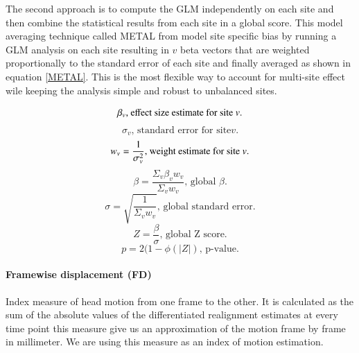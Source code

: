 \documentclass[authoryear]{elsarticle}
\begin{document}
The second approach is to compute the GLM independently on each site and then combine the statistical results from each site in a global score. This model averaging technique called METAL from \cite{Willer2010} model site specific bias by running a GLM analysis on each site resulting in $v$ beta vectors that are weighted proportionally to the standard error of each site and finally averaged as shown in equation \ref{METAL}. This is the most flexible way to account for multi-site effect wile keeping the analysis simple and robust to unbalanced sites.

\begin{equation}
	\beta_{v} \text{, effect size estimate for site \textit{v}.}
\end{equation}
\begin{equation}
	\sigma_{v} \text{, standard error for site} \textit{v}.
\end{equation}
\begin{equation}
 	w_{v}=\frac{1}{\sigma_{v}^{2}} \text{, weight estimate for site \textit{v}.}
 \end{equation}
 \begin{equation}
 	\beta=\frac{\Sigma_{v}\beta_{v}w_{v}}{\Sigma_{v}w_{v}} \text{, global }\beta.
 \end{equation}
  \begin{equation}
 	\sigma=\sqrt{\frac{1}{\Sigma_{v}w_{v}}} \text{, global standard error.}
 \end{equation}
\begin{equation}\label{METAL}
	Z=\frac{\beta}{\sigma} \text{, global Z score.}
\end{equation}
\begin{equation}
	p=2(1-\phi(\vert Z \vert) \text{, p-value.}
\end{equation}



\paragraph{Framewise displacement (FD)}
Index measure of head motion from one frame to the other. It is calculated as the sum of the absolute values of the differentiated realignment estimates at every time point \citep{Power2012} this measure give us an approximation of the motion frame by frame in millimeter. We are using this measure as an index of motion estimation.
\end{document}
